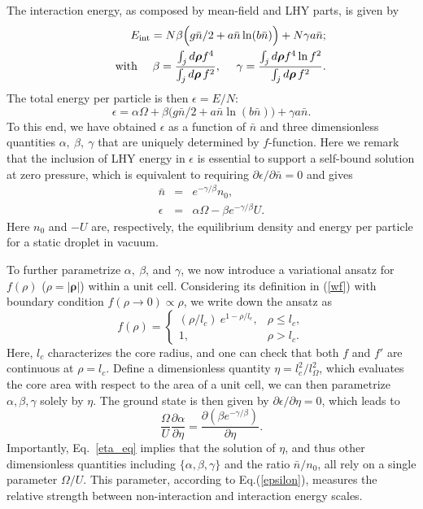 \documentclass[reprint,aps,pra,twocolumn,superscriptaddress]{revtex4-1}
\begin{document}
The interaction energy, as composed by mean-field and LHY parts, is given by
\begin{eqnarray}
&&\ \ \ \ \ \   E_{\rm int}=N\beta\Big(g\bar{n}/2 + a \bar{n}\ln(b\bar{n})\Big) + N\gamma a \bar{n}; \label{Eint} \\
&&{\rm with}  \ \ \ \ \beta = \dfrac{\int_j d\bm{\rho}f^4}{{\int_j d\bm{\rho}\, f^2}}, \ \ \ \  \gamma = \dfrac{\int_j d\bm{\rho}f^4\ln f^2}{{\int_j d\bm{\rho}\, f^2}}. \nonumber
\end{eqnarray}
The total energy per particle is then $\epsilon=E/N$:
\begin{equation}
\epsilon=\alpha\Omega+ \beta\big(g\bar{n}/2 + a \bar{n}\ln(b\bar{n})\Big) + \gamma a \bar{n}. \label{total_E}
\end{equation}
To this end, we have obtained $\epsilon$ as a function of $\bar{n}$ and three dimensionless quantities $\alpha,\ \beta,\ \gamma$ that are uniquely determined by $f$-function. Here we remark that the inclusion of LHY energy in $\epsilon$ is essential to support a self-bound solution at zero pressure, which is equivalent to requiring $\partial \epsilon/\partial \bar{n}=0$ and gives 
\begin{eqnarray}
    \bar{n}&=&e^{-\gamma/\beta}n_0, \label{nbar} \\
    \epsilon &=& \alpha\Omega - \beta e^{-\gamma/\beta}U.  \label{epsilon}
\end{eqnarray}
Here $n_0$ and $-U$ are, respectively, the equilibrium density and energy per particle for a static droplet in vacuum. 

To further parametrize $\alpha,\ \beta$, and $\gamma$, we now introduce a variational ansatz for $f(\rho)$ ($\rho=|\bm{\rho}|$) within a unit cell. Considering its definition in (\ref{wf}) with boundary condition $f(\rho\rightarrow 0)\propto \rho$, we write down the ansatz as 
\begin{equation}\label{trial_f}
    f({\rho})=\begin{cases}
        (\rho/l_c)\ e^{1-\rho/l_c}, & \rho\le l_c, \\
        1, & \rho> l_c.
    \end{cases} 
\end{equation}
Here, $l_c$ characterizes the core radius, and one can check that both $f$ and $f'$ are continuous at $\rho=l_c$. Define a dimensionless quantity $\eta=l_c^2/l_{\Omega}^2$, which evaluates the core area with respect to the area of a unit cell, we can then parametrize $\alpha,\beta,\gamma$ solely by $\eta$. The ground state is then given by $\partial\epsilon /\partial \eta=0$, which leads to
\begin{equation}
    \dfrac{\Omega}{U}  \dfrac{\partial \alpha}{\partial \eta} =  \dfrac{\partial(\beta e^{-\gamma/\beta})}{\partial \eta}. \label{eta_eq}
\end{equation}
Importantly, Eq.~\eqref{eta_eq} implies that the solution of $\eta$, and thus other dimensionless quantities including  $\{\alpha,\beta,\gamma\}$ and the ratio $\bar{n}/n_0$, all rely on a single parameter $\Omega/U$. This parameter, according to Eq.(\ref{epsilon}), measures the relative strength between non-interaction and interaction energy scales. 
\end{document}
